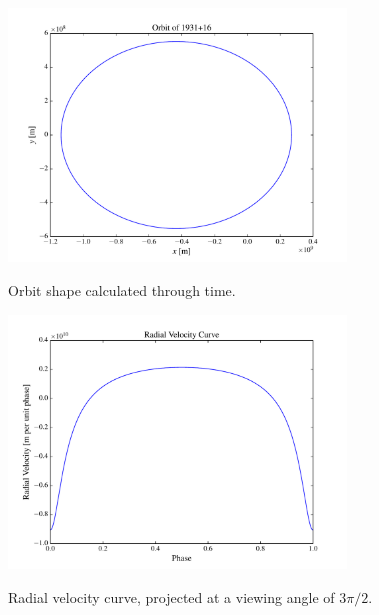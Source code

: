 \documentclass{article}
\begin{document}
\begin{figure}[ht!]\centering
    \includegraphics[width=0.8\textwidth]{orbit.pdf}
    \label{orbit}
    \caption{Orbit shape calculated through time.}
\end{figure}

\begin{figure}[ht!]\centering
    \includegraphics[width=0.8\textwidth]{vr_curve.pdf}
    \label{orbit}
    \caption{Radial velocity curve, projected at a viewing angle
    of $3\pi/2$.}
\end{figure}
\end{document}

